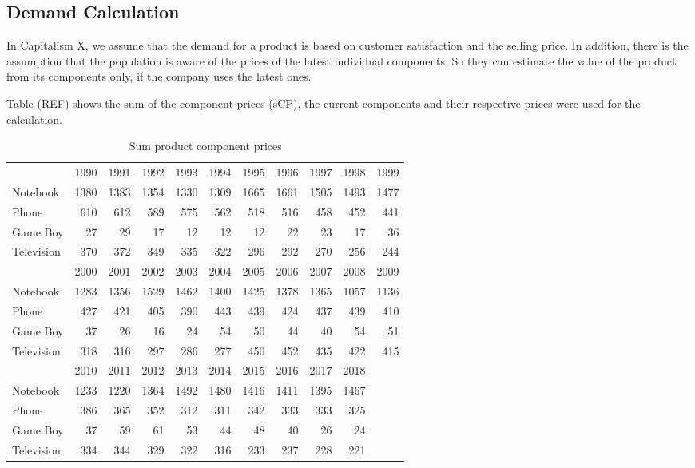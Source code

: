 \subsection{Demand Calculation}
\label{demandCalc}
In Capitalism X, we assume that the demand for a product is based on customer satisfaction and the selling price. In addition, there is the assumption that the population is aware of the prices of the latest individual components. So they can estimate the value of the product from its components only, if the company uses the latest ones.
 
Table (REF) shows the sum of the component prices (sCP), the current components and their respective prices were used for the calculation.

\begin{table}[ht]
    \centering
    \begin{tabular}{|l|r|r|r|r|r|r|r|r|r|r|}
    \hline
                & 1990  & 1991  & 1992  & 1993  & 1994  & 1995  & 1996  & 1997  & 1998  & 1999  \\
    Notebook    & 1380  & 1383  & 1354  & 1330  & 1309  & 1665  & 1661  & 1505  & 1493  & 1477  \\   
    Phone       & 610   & 612   & 589   & 575   & 562   & 518   & 516   & 458   & 452   & 441   \\ 
    Game Boy    & 27    & 29    & 17    & 12    & 12    & 12    & 22    & 23    & 17    & 36    \\  
    Television  & 370   & 372   & 349   & 335   & 322   & 296   & 292   & 270   & 256   & 244    \\ 
    \hline       
                & 2000  & 2001  & 2002  & 2003  & 2004  & 2005  & 2006  & 2007  & 2008  & 2009  \\
    Notebook    & 1283  & 1356  & 1529  & 1462  & 1400  & 1425  & 1378  & 1365  & 1057  & 1136       \\   
    Phone       & 427   & 421   & 405   & 390   & 443   & 439   & 424   & 437   & 439   & 410      \\  
    Game Boy    & 37    & 26    & 16    & 24    & 54    & 50    & 44    & 40    & 54    & 51      \\   
    Television  & 318   & 316   & 297   & 286   & 277   & 450   & 452   & 435   & 422   & 415      \\ 
    \hline
                & 2010  & 2011  & 2012  & 2013  & 2014  & 2015  & 2016  & 2017  & 2018    \\
    Notebook    & 1233  & 1220  & 1364  & 1492  & 1480  & 1416  & 1411  & 1395  & 1467    \\   
    Phone       & 386   & 365   & 352   & 312   & 311   & 342   & 333   & 333   & 325     \\ 
    Game Boy    & 37    & 59    & 61    & 53    & 44    & 48    & 40    & 26    & 24      \\  
    Television  & 334   & 344   & 329   & 322   & 316   & 233   & 237   & 228   & 221      \\ 
    \hline
    \end{tabular}
    \caption{Sum product component prices}
    \label{sum_product_component_prices}
\end{table}
 
